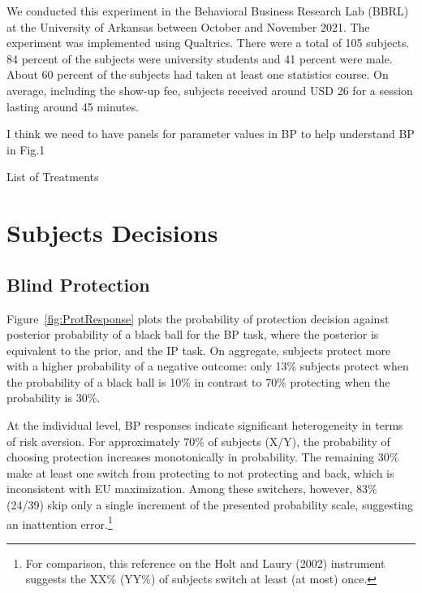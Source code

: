 \documentclass[12pt,a4paper]{article}
\newcommand{\pmt}[1]{{\color{Blue}#1}}
\begin{document}
We conducted this experiment in the Behavioral Business Research Lab (BBRL) at the University of Arkansas between October and November 2021.  The experiment was implemented using Qualtrics. There were a total of 105 subjects. 84 percent of the subjects were university students and 41 percent were male.  About 60 percent of the subjects had taken at least one statistics course. On average, including the show-up fee, subjects received around USD 26 for a session lasting around 45 minutes.  



\pmt{I think we need to have panels for parameter values in BP to help understand BP in Fig.1}
\begin{table}[h!]
\caption{List of Treatments} \label{tab:treatments}

\end{table}


\vspace{20pt}
\section{Subjects Decisions}\label{sec:sanity}

\subsection{Blind Protection}

Figure~\ref{fig:ProtResponse} plots the probability of protection decision against posterior probability of a black ball for the BP task, where the posterior is equivalent to the prior, and the IP task. On aggregate, subjects protect more with a higher probability of a negative outcome: only 13\% subjects protect when the probability of a black ball is 10\% in contrast to 70\% protecting when the probability is 30\%. 

At the individual level, BP responses indicate significant heterogeneity in terms of risk aversion. For approximately 70\% of subjects (X/Y), the probability of choosing protection increases monotonically in probability. The remaining 30\% make at least one switch from protecting to not protecting and back, which is inconsistent with EU maximization. Among these switchers, however, 83\% (24/39) skip only a single increment of the presented probability scale, suggesting an inattention error.\footnote{For comparison, this reference on the Holt and Laury (2002) instrument suggests the XX\% (YY\%) of subjects switch at least (at most) once.} 
\end{document}
